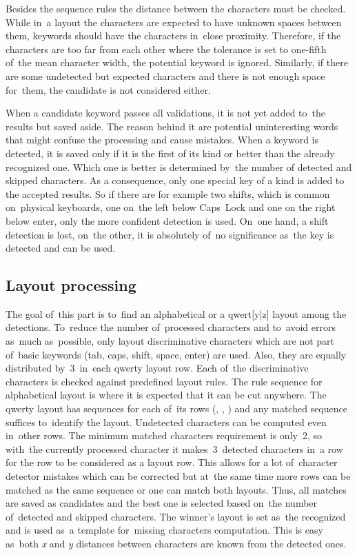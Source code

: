 Besides the sequence rules the distance between the characters must be checked. While in~a layout the characters are expected to have unknown spaces between them, keywords should have the characters in~close proximity. Therefore, if the characters are too far from each other where the tolerance is set to one-fifth of~the mean character width, the potential keyword is ignored. Similarly, if there are some undetected but expected characters and there is not enough space for~them, the candidate is not considered either.

When a candidate keyword passes all validations, it is not yet added to~the results but saved aside. The reason behind it are potential uninteresting words that might confuse the processing and cause mistakes. When a keyword is detected, it is saved only if it is the first of its kind or better than the already recognized one. Which one is better is determined by~the number of detected and skipped characters. As a consequence, only one special key of a kind is added to the accepted results. So if there are for example two shifts, which is common on~physical keyboards, one on~the left below Caps~Lock and one on the right below enter, only the more confident detection is used. On~one hand, a shift detection is lost, on~the other, it is absolutely of~no significance as~the key is detected and can be used.

\subsection{Layout processing}
\label{postprocessing-layout}
The goal of~this part is to~find an alphabetical or a qwert[y|z] layout among the detections. To~reduce the number of~processed characters and to~avoid errors as~much as~possible, only \hbox{layout} discriminative characters  which are not part of~basic keywords (tab, caps, shift, space, enter) are used. Also, they are equally distributed by~3~in~each \hbox{qwerty} layout row.  Each of~the discriminative characters is checked against predefined \hbox{layout} rules. The rule sequence for alphabetical layout is  where it is expected that it can be cut anywhere. The qwerty layout has sequences for each of~its rows (\hbox{}, \hbox{}, \hbox{}) and any matched sequence suffices to~identify the layout. Undetected characters can be computed even in~other rows. The minimum matched \hbox{characters} requirement is only~2, so with~the currently processed character it makes~3~detected characters in~a row for the row to be considered as a layout row. This allows for a lot of~character detector mistakes which can be corrected but at~the same time more rows can be matched as the same sequence or one can match both layouts. Thus, all matches are saved as candidates and the best one is selected based on~the number of~detected and skipped characters. The winner's layout is set as~the recognized and is used as~a template for~missing characters computation. This is easy as~both \emph{x} and \emph{y} distances between characters are known from the detected ones.

